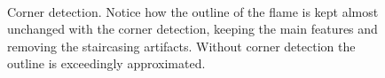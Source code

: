 \documentclass[]{usiinfbachelorproject}
\begin{document}
\begin{figure}[ht]
	\centering
	\\
	\caption{Corner detection. Notice how the outline of the flame is kept almost unchanged with the corner detection, keeping the main features and removing the staircasing artifacts. Without corner detection the outline is exceedingly approximated.}
	\label{fig:excorners}
\end{figure}
\end{document}
